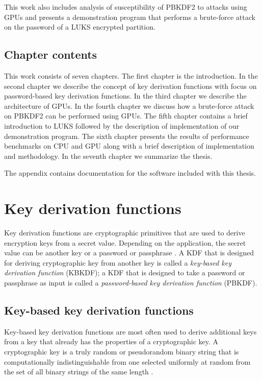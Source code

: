 \documentclass[12pt,oneside]{fithesis2}
\begin{document}
      This work also includes analysis of susceptibility of PBKDF2 to attacks using GPUs and presents a demonstration program that performs a brute-force attack on the password of a LUKS encrypted partition.
      
      \section{Chapter contents}
      This work consists of seven chapters. The first chapter is the introduction. In the second chapter we describe the concept of key derivation functions with focus on password-based key derivation functions. In the third chapter we describe the architecture of GPUs. In the fourth chapter we discuss how a brute-force attack on PBKDF2 can be performed using GPUs. The fifth chapter contains a brief introduction to LUKS followed by the description of implementation of our demonstration program. The sixth chapter presents the results of performance benchmarks on CPU and GPU along with a brief description of implementation and methodology. In the seventh chapter we summarize the thesis.
      
      The appendix contains documentation for the software included with this thesis.
    
    \chapter{Key derivation functions}
      Key derivation functions are cryptographic primitives that are used to derive encryption keys from a secret value. Depending on the application, the secret value can be another key or a password or passphrase \cite{wiki:KDF}. A KDF that is designed for deriving cryptographic key from another key is called a \emph{key-based key derivation function} (KBKDF); a KDF that is designed to take a password or passphrase as input is called a \emph{password-based key derivation function} (PBKDF).
      
      \section{Key-based key derivation functions}
      Key-based key derivation functions are most often used to derive additional keys from a key that already has the properties of a cryptographic key. A cryptographic key is a truly random or pseudorandom binary string that is computationally indistinguishable from one selected uniformly at random from the set of all binary strings of the same length \cite{nist:sp800:108}.
      
\end{document}
